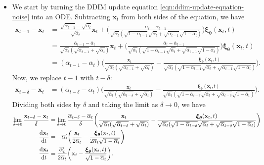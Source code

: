 \documentclass[10pt]{article}
\newcommand{\dee}{\mathrm{d}}
\newcommand{\ve}[1]{\mathbf{#1}}
\newcommand{\ves}[1]{\boldsymbol{#1}}
\newcommand{\ov}[1]{\overline{#1}}
\begin{document}
\begin{itemize}
  \item We start by turning the DDIM update equation \eqref{eqn:ddim-update-equation-noise} into an ODE. Subtracting $\ve{x}_t$ from both sides of the equation, we have
  \begin{align*}
    \ve{x}_{t-1} - \ve{x}_t
    &= \frac{\sqrt{\ov{\alpha}_{t-1}} - \sqrt{\ov{\alpha}_t}}{\sqrt{\ov{\alpha}_t}} \ve{x}_t     
    + \bigg(  \frac{ \ov{\alpha}_t - \ov{\alpha}_{t-1} }{\sqrt{\ov{\alpha}_t}(\sqrt{1 - \ov{\alpha}_{t-1}}\sqrt{\ov{\alpha}_t} + \sqrt{\ov{\alpha}_{t-1}} \sqrt{1 - \ov{\alpha}_t} )}   \bigg) \ves{\xi}_{\ves{\theta}}(\ve{x}_t, t) \\
    &= \frac{\ov{\alpha}_{t-1} - \ov{\alpha}_t}{\sqrt{\ov{\alpha}_t}(\sqrt{\ov{\alpha}_{t-1}} + \sqrt{\ov{\alpha}_t}) } \ve{x}_t
    + \bigg(  \frac{ \ov{\alpha}_t - \ov{\alpha}_{t-1} }{\sqrt{\ov{\alpha}_t}(\sqrt{1 - \ov{\alpha}_{t-1}}\sqrt{\ov{\alpha}_t} + \sqrt{\ov{\alpha}_{t-1}} \sqrt{1 - \ov{\alpha}_t} )}   \bigg) \ves{\xi}_{\ves{\theta}}(\ve{x}_t, t) \\
    &= (\ov{\alpha}_{t-1} - \ov{\alpha}_t) \bigg( \frac{\ve{x}_t}{\sqrt{\ov{\alpha}_t}(\sqrt{\ov{\alpha}_{t-1}} + \sqrt{\ov{\alpha}_t}) } - \frac{\ves{\xi}_{\ves{\theta}}(\ve{x}_t,t)}{\sqrt{\ov{\alpha}_t}(\sqrt{1 - \ov{\alpha}_{t-1}}\sqrt{\ov{\alpha}_t} + \sqrt{\ov{\alpha}_{t-1}} \sqrt{1 - \ov{\alpha}_t} )} \bigg).
  \end{align*}
  Now, we replace $t - 1$ with $t - \delta$:
  \begin{align*}
    \ve{x}_{t-\delta} - \ve{x}_t &= 
    (\ov{\alpha}_{t-\delta} - \ov{\alpha}_t) \bigg( \frac{\ve{x}_t}{\sqrt{\ov{\alpha}_t}(\sqrt{\ov{\alpha}_{t-\delta}} + \sqrt{\ov{\alpha}_t}) } - \frac{\ves{\xi}_{\ves{\theta}}(\ve{x}_t,t)}{\sqrt{\ov{\alpha}_t}(\sqrt{1 - \ov{\alpha}_{t-\delta}}\sqrt{\ov{\alpha}_t} + \sqrt{\ov{\alpha}_{t-\delta}} \sqrt{1 - \ov{\alpha}_t} )} \bigg).
  \end{align*}
  Dividing both sides by $\delta$ and taking the limit as $\delta \rightarrow 0$, we have
  \begin{align}
    \lim_{\delta \rightarrow 0} \frac{\ve{x}_{t-\delta} - \ve{x}_t}{\delta}
    &= \lim_{\delta \rightarrow 0} \frac{\ov{\alpha}_{t-\delta} - \ov{\alpha}_t}{\delta} \bigg( \frac{\ve{x}_t}{\sqrt{\ov{\alpha}_t}(\sqrt{\ov{\alpha}_{t-\delta}} + \sqrt{\ov{\alpha}_t}) } - \frac{\ves{\xi}_{\ves{\theta}}(\ve{x}_t,t)}{\sqrt{\ov{\alpha}_t}(\sqrt{1 - \ov{\alpha}_{t-\delta}}\sqrt{\ov{\alpha}_t} + \sqrt{\ov{\alpha}_{t-\delta}} \sqrt{1 - \ov{\alpha}_t} )} \bigg) \notag \\
    -\frac{\dee \ve{x}_t}{\dee t} &= -\ov{\alpha}_t' \bigg( \frac{\ve{x}_t}{2\ov{\alpha}_t} - \frac{\ves{\xi}_{\ves{\theta}}(\ve{x}_t,t)}{2\ov{\alpha}_t \sqrt{1 - \ov{\alpha}_t}} \bigg) \notag \\
    \frac{\dee \ve{x}_t}{\dee t} &= \frac{\ov{\alpha}_t'}{2 \ov{\alpha}_t} \bigg( \ve{x}_t - \frac{\ves{\xi}_{\ves{\theta}}(\ve{x}_t,t)}{\sqrt{1 - \ov{\alpha}_t}} \bigg) \label{eqn:ddim-ode-noise}.
  \end{align}


\end{itemize}
\end{document}
